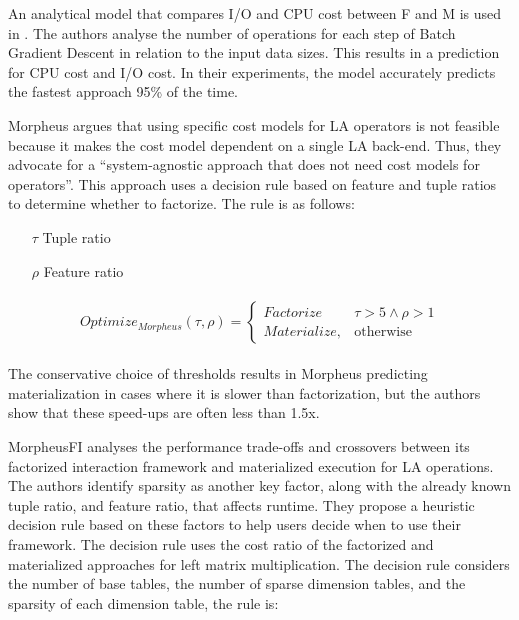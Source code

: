 An analytical model that compares I/O and CPU cost between F and M is used in \cite{orion_learning_gen_lin_models}. The authors analyse the number of operations for each step of Batch Gradient Descent in relation to the input data sizes. This results in a prediction for CPU cost and I/O cost. In their experiments, the model accurately predicts the fastest approach 95\% of the time.


Morpheus \cite{morpheus} argues that using specific cost models for LA operators is not feasible because it makes the cost model dependent on a single LA back-end. Thus, they advocate for a “system-agnostic approach that does not need cost models for operators”. This approach uses a decision rule based on feature and tuple ratios to determine whether to factorize. The rule is as follows:

\begin{definition}
    \begin{itemize}
        \item[]
        \item[$\tau$] Tuple ratio
        \item[$\rho$] Feature ratio
    \end{itemize}

    \begin{align*}
        \begin{split}
            Optimize_{Morpheus}(\tau, \rho) =
            \begin{cases}
                Factorize    & \tau > 5 \wedge \rho > 1 \\
                Materialize, & \text{otherwise}
            \end{cases}
        \end{split}
    \end{align*}
\end{definition}

The conservative choice of thresholds results in Morpheus predicting materialization in cases where it is slower than factorization, but the authors show that these speed-ups are often less than 1.5x.

MorpheusFI \cite{MorpheusFIEnablingOptimizingNonlinear2019} analyses the performance trade-offs and crossovers between its factorized interaction framework and materialized execution for LA operations. The authors identify sparsity as another key factor, along with the already known tuple ratio, and feature ratio, that affects runtime. They propose a heuristic decision rule based on these factors to help users decide when to use their framework. The decision rule uses the cost ratio of the factorized and materialized approaches for left matrix multiplication. The decision rule considers the number of base tables, the number of sparse dimension tables, and the sparsity of each dimension table, the rule is:

